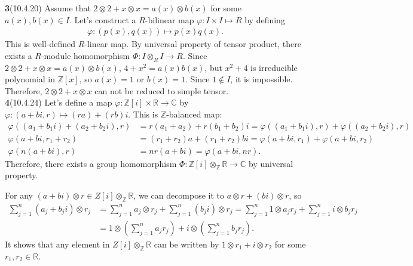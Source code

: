 \documentclass[a4paper, 12pt]{article}
\theoremstyle{Mydefinition}
\theoremstyle{Mytheorem}
\begin{document}
\noindent \textbf{3}(10.4.20)
Assume that $2\otimes 2 + x\otimes x = a(x)\otimes b(x)$ for some $a(x),b(x)\in I$. Let's construct a $R$-bilinear map $\varphi : I\times I\mapsto R$ by defining
\begin{equation}
    \begin{split}
        \varphi:(p(x), q(x))\mapsto p(x)q(x).
    \end{split}
\end{equation}
This is well-defined $R$-linear map. By universal property of tensor product, there exists a $R$-module homomorphism $\Phi:I\otimes_R I\rightarrow R$. Since $2\otimes 2 + x\otimes x = a(x)\otimes b(x)$, $4+x^2 = a(x)b(x)$, but $x^2+4$ is irreducible polynomial in $\mathbb{Z}[x]$, so $a(x)=1$ or $b(x)=1$. Since $1\not\in I$, it is impossible. Therefore, $2\otimes 2 + x\otimes x$ can not be reduced to simple tensor.\\

\noindent \textbf{4}(10.4.24)
Let's define a map $\varphi:\mathbb{Z}[i]\times \mathbb{R}\rightarrow \mathbb{C}$ by $\varphi:(a+bi, r)\mapsto (ra)+(rb)i$. This is $\mathbb{Z}$-balanced map:
\begin{equation}
    \begin{split}
        \varphi((a_1+b_1i)+(a_2+b_2i), r) &= r(a_1+a_2)+r(b_1+b_2)i = \varphi((a_1+b_1i), r) + \varphi((a_2+b_2i), r)\\
        \varphi(a+bi, r_1+r_2) &= (r_1+r_2)a+(r_1+r_2)bi = \varphi(a+bi, r_1) + \varphi(a+bi, r_2)\\
        \varphi(n(a+bi), r) &= nr(a+bi) = \varphi(a+bi, nr).
    \end{split}
\end{equation}
Therefore, there exists a group homomorphism $\Phi:\mathbb{Z}[i]\otimes_{\mathbb{Z}} \mathbb{R}\rightarrow \mathbb{C}$ by universal property. 

For any $(a+bi)\otimes r\in Z[i]\otimes_{\mathbb{Z}}\mathbb{R}$, we can decompose it to $a\otimes r + (bi)\otimes r$, so
\begin{equation}
\begin{split}
    \sum_{j=1}^n (a_j+b_ji)\otimes r_j &= \sum_{j=1}^n a_j\otimes r_j + \sum_{j=1}^n (b_ji)\otimes r_j = \sum_{j=1}^n 1\otimes a_jr_j + \sum_{j=1}^n i\otimes b_jr_j\\
    &= 1\otimes \left(\sum_{j=1}^n a_jr_j\right) + i\otimes \left(\sum_{j=1}^n b_jr_j\right).
\end{split}
\end{equation}
It shows that any element in $Z[i]\otimes_{\mathbb{Z}}\mathbb{R}$ can be written by $1\otimes r_1+i\otimes r_2$ for some $r_1,r_2\in\mathbb{R}$.
\end{document}
